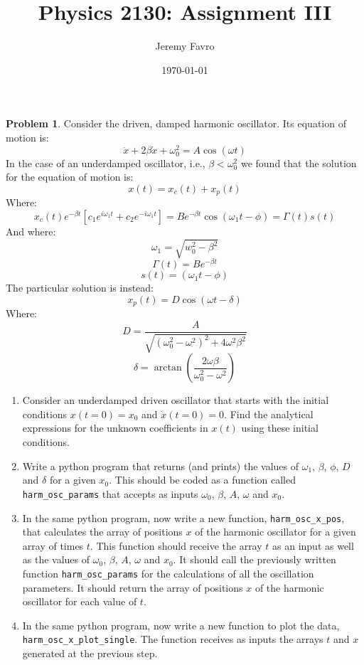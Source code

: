 \documentclass[10pt]{article}
\title{Physics 2130: Assignment III}
\author{Jeremy Favro}
\date{\today}
\theoremstyle{definition}
\newtheorem{problem}{Problem}
\begin{document}
\maketitle

\begin{problem}
Consider the driven, damped harmonic oscillator. Its equation of motion is:
$$\ddot{x}+2\beta\dot{x}+\omega_0^2=A\cos\left(\omega t\right)$$
In the case of an underdamped oscillator, i.e., $\beta<\omega_0^2$ we found that the solution for the equation of motion is:
$$x(t)=x_c(t)+x_p(t)$$
Where:
$$x_c(t)e^{-\beta t}\left[c_1e^{i\omega_1 t}+c_2e^{-i\omega_1 t}\right]=Be^{-\beta t}\cos\left(\omega_1 t-\phi\right)=\Gamma(t)s(t)$$
And where:
$$\omega_1=\sqrt{w_0^2-\beta^2}$$
$$\Gamma(t)=Be^{-\beta t}$$
$$s(t)=\left(\omega_1 t-\phi\right)$$
The particular solution is instead:
$$x_p(t)=D\cos\left(\omega t-\delta\right)$$
Where:
$$D=\frac{A}{\sqrt{\left(\omega_0^2-\omega^2\right)^2+4\omega^2\beta^2}}$$
$$\delta=\arctan\left(\frac{2\omega\beta}{\omega_0^2-\omega^2}\right)$$
\begin{enumerate}[label=(\alph*)]
      \item Consider an underdamped driven oscillator that starts with the initial conditions $x(t=0)=x_0$ and $\dot{x}(t=0)=0$.
            Find the analytical expressions for the unknown coefficients in $x(t)$ using these initial conditions.

      \item Write a python program that returns (and prints) the values of $\omega_1$, $\beta$, $\phi$, $D$ and $\delta$ for a given $x_0$. This should
            be coded as a function called \verb|harm_osc_params| that accepts as inputs $\omega_0$, $\beta$, $A$, $\omega$ and $x_0$.

      \item In the same python program, now write a new function, \verb|harm_osc_x_pos|, that calculates the array of positions $x$ of the
            harmonic oscillator for a given array of times $t$. This function should receive the array $t$ as an input as well as the values of $\omega_0$,
            $\beta$, $A$, $\omega$ and $x_0$. It should call the previously written function \verb|harm_osc_params| for the calculations of all the oscillation parameters.
            It should return the array of positions $x$ of the harmonic oscillator for each value of $t$.

      \item In the same python program, now write a new function to plot the data, \verb|harm_osc_x_plot_single|. The
            function receives as inputs the arrays $t$ and $x$ generated at the previous step.


\end{enumerate}
\end{problem}
\end{document}
